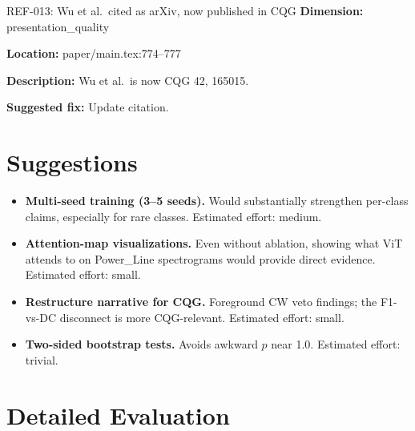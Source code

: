 \documentclass[11pt]{article}
\begin{document}
\begin{MinorIssueBox}{REF-013: Wu et al.\ cited as arXiv, now published in CQG}
\textbf{Dimension:} presentation\_quality

\textbf{Location:} paper/main.tex:774--777

\textbf{Description:} Wu et al.\ is now CQG 42, 165015.

\textbf{Suggested fix:} Update citation.
\end{MinorIssueBox}


\section*{Suggestions}
\begin{itemize}
  \item \textbf{Multi-seed training (3--5 seeds).} Would substantially strengthen per-class claims, especially for rare classes. Estimated effort: medium.
  \item \textbf{Attention-map visualizations.} Even without ablation, showing what ViT attends to on Power\_Line spectrograms would provide direct evidence. Estimated effort: small.
  \item \textbf{Restructure narrative for CQG.} Foreground CW veto findings; the F1-vs-DC disconnect is more CQG-relevant. Estimated effort: small.
  \item \textbf{Two-sided bootstrap tests.} Avoids awkward $p$ near 1.0. Estimated effort: trivial.
\end{itemize}


\section*{Detailed Evaluation}
\end{document}
